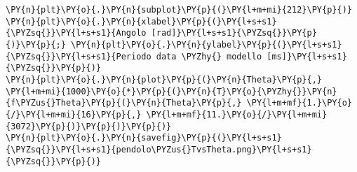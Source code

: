 \begin{Verbatim}[label=\makebox{\href{https://github.com/unipi-physics-labs/lab1-sheets/tree/main/snippy/plasduino_pendulum.py}{https://github.com/.../plasduino\_pendulum.py}},commandchars=\\\{\}]
\PY{n}{plt}\PY{o}{.}\PY{n}{subplot}\PY{p}{(}\PY{l+m+mi}{212}\PY{p}{)}
\PY{n}{plt}\PY{o}{.}\PY{n}{xlabel}\PY{p}{(}\PY{l+s+s1}{\PYZsq{}}\PY{l+s+s1}{Angolo [rad]}\PY{l+s+s1}{\PYZsq{}}\PY{p}{)}\PY{p}{;} \PY{n}{plt}\PY{o}{.}\PY{n}{ylabel}\PY{p}{(}\PY{l+s+s1}{\PYZsq{}}\PY{l+s+s1}{Periodo data \PYZhy{} modello [ms]}\PY{l+s+s1}{\PYZsq{}}\PY{p}{)} 
\PY{n}{plt}\PY{o}{.}\PY{n}{plot}\PY{p}{(}\PY{n}{Theta}\PY{p}{,} \PY{l+m+mi}{1000}\PY{o}{*}\PY{p}{(}\PY{n}{T}\PY{o}{\PYZhy{}}\PY{n}{f\PYZus{}Theta}\PY{p}{(}\PY{n}{Theta}\PY{p}{,} \PY{l+m+mf}{1.}\PY{o}{/}\PY{l+m+mi}{16}\PY{p}{,} \PY{l+m+mf}{11.}\PY{o}{/}\PY{l+m+mi}{3072}\PY{p}{)}\PY{p}{)}\PY{p}{)}
\PY{n}{plt}\PY{o}{.}\PY{n}{savefig}\PY{p}{(}\PY{l+s+s1}{\PYZsq{}}\PY{l+s+s1}{pendolo\PYZus{}TvsTheta.png}\PY{l+s+s1}{\PYZsq{}}\PY{p}{)}
\end{Verbatim}
